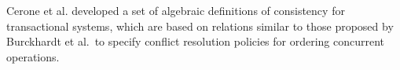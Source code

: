 \documentclass[conference]{IEEEtran}
\begin{document}
	Cerone et al. \cite{DBLP:conf/concur/CeroneGY17} developed a set of algebraic definitions of consistency for transactional systems, which are based on relations similar to those proposed by Burckhardt et al.\ to specify conflict resolution policies for ordering concurrent operations.
\end{document}
